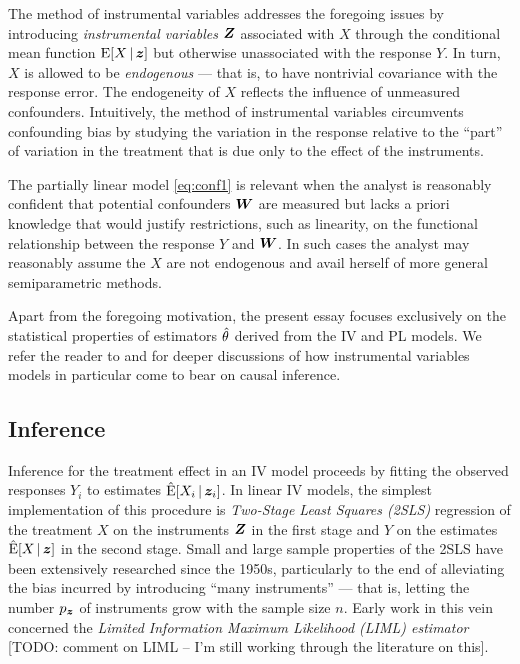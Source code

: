 \documentclass{uwstat572}
\newcommand{\E}{\mathrm{E}}
\newcommand{\Ehat}{\hat{\E}}
\numberwithin{equation}{section}
\begin{document}
The method of instrumental variables addresses the foregoing issues by introducing \emph{instrumental variables} $\boldsymbol{Z}$ associated with $X$ through the conditional mean function $\E[X\,|\,\z]$ but otherwise unassociated with the response $Y$. In turn, $X$ is allowed to be \emph{endogenous} --- that is, to have nontrivial covariance with the response error. The endogeneity of $X$ reflects the influence of unmeasured confounders. Intuitively, the method of instrumental variables circumvents confounding bias by studying the variation in the response relative to the ``part'' of variation in the treatment that is due only to the effect of the instruments. 


The partially linear model \ref{eq:conf1} is relevant when the analyst is reasonably confident that potential confounders $\boldsymbol{W}$ are measured but lacks a priori knowledge that would justify restrictions, such as linearity, on the functional relationship between the response $Y$ and $\boldsymbol{W}$. In such cases the analyst may reasonably assume the $X$ are not endogenous and avail herself of more general semiparametric methods.

Apart from the foregoing motivation, the present essay focuses exclusively on the statistical properties of estimators $\hat{\theta}$ derived from the IV and PL models. We refer the reader to \cite[Chapter 5]{P09} and \cite{AK01} for deeper discussions of how instrumental variables models in particular come to bear on causal inference. 


%

\subsection{Inference}

Inference for the treatment effect in an IV model proceeds by fitting the observed responses $Y_i$ to estimates $\Ehat[X_i\,|\,\z_i]$. In linear IV models, the simplest implementation of this procedure is \emph{Two-Stage Least Squares (2SLS)} regression of the treatment $X$ on the instruments $\boldsymbol{Z}$ in the first stage and $Y$ on the estimates $\Ehat[X\,|\,\z]$ in the second stage. Small and large sample properties of the 2SLS have been extensively researched since the 1950s, particularly to the end of alleviating the bias incurred by introducing ``many instruments'' --- that is, letting the number ${p_{\boldsymbol{z}}}$ of instruments grow with the sample size $n$. Early work in this vein concerned the \emph{Limited Information Maximum Likelihood (LIML) estimator} [TODO: comment on LIML -- I'm still working through the literature on this]. 
\end{document}
